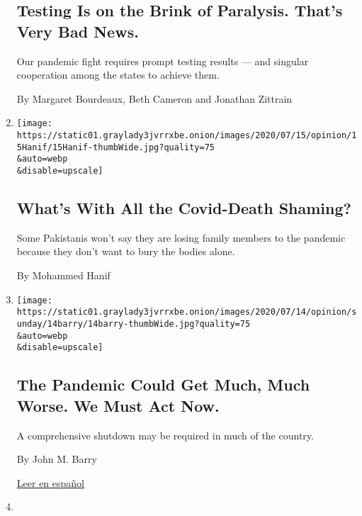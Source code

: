 \begin{enumerate}
  \hypertarget{testing-is-on-the-brink-of-paralysis-thats-very-bad-news}{%
  \subsection{Testing Is on the Brink of Paralysis. That's Very Bad
  News.}\label{testing-is-on-the-brink-of-paralysis-thats-very-bad-news}}

  Our pandemic fight requires prompt testing results --- and singular
  cooperation among the states to achieve them.

  By Margaret Bourdeaux, Beth Cameron and Jonathan Zittrain
\item
  \href{/2020/07/16/opinion/coronavirus-pakistan-death.html}{}

  \texttt{[image: https://static01.graylady3jvrrxbe.onion/images/2020/07/15/opinion/15Hanif/15Hanif-thumbWide.jpg?quality=75\\\&auto=webp\\\&disable=upscale]}

  \hypertarget{whats-with-all-the-covid-death-shaming}{%
  \subsection{What's With All the Covid-Death
  Shaming?}\label{whats-with-all-the-covid-death-shaming}}

  Some Pakistanis won't say they are losing family members to the
  pandemic because they don't want to bury the bodies alone.

  By Mohammed Hanif
\item
  \href{/2020/07/14/opinion/coronavirus-shutdown.html}{}

  \texttt{[image: https://static01.graylady3jvrrxbe.onion/images/2020/07/14/opinion/sunday/14barry/14barry-thumbWide.jpg?quality=75\\\&auto=webp\\\&disable=upscale]}

  \hypertarget{the-pandemic-could-get-much-much-worse-we-must-act-now}{%
  \subsection{The Pandemic Could Get Much, Much Worse. We Must Act
  Now.}\label{the-pandemic-could-get-much-much-worse-we-must-act-now}}

  A comprehensive shutdown may be required in much of the country.

  By John M. Barry

  \href{https://www.nytimes3xbfgragh.onion/es/2020/07/16/espanol/opinion/coronavirus-cuarentena.html}{Leer
  en español}
\item
  \href{/2020/07/13/opinion/obamacare-aca-trump-women.html}{}


\end{enumerate}
